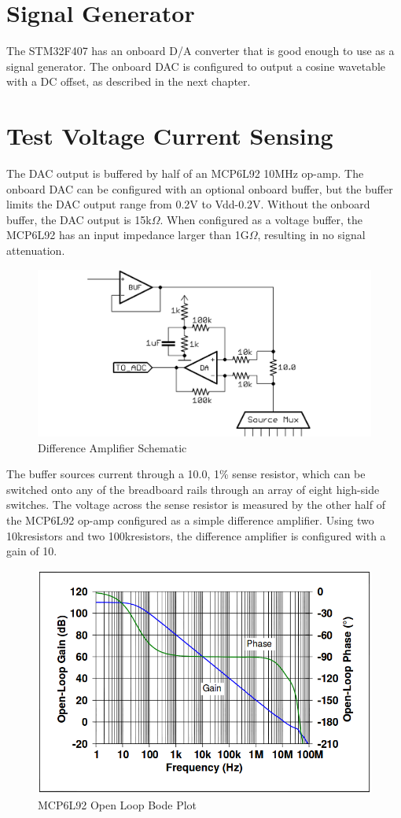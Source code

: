 \section{Signal Generator}

The STM32F407 has an onboard D/A converter that is good enough to use as a signal generator.
The onboard DAC is configured to output a cosine wavetable with a DC offset, as described in the next chapter.

\section{Test Voltage Current Sensing}

The DAC output is buffered by half of an MCP6L92 10MHz op-amp.
The onboard DAC can be configured with an optional onboard buffer, but the buffer limits the DAC output range from 0.2V to Vdd-0.2V.
Without the onboard buffer, the DAC output is 15k$\Omega$.
When configured as a voltage buffer, the MCP6L92 has an input impedance larger than 1G$\Omega$, resulting in no signal attenuation.

\begin{figure}[h!]
  \begin{center}
      \includegraphics[width=.7\textwidth]{../DA.png}
      \caption{Difference Amplifier Schematic}
  \end{center}
\end{figure}

The buffer sources current through a 10.0\ohm, 1\% sense resistor, which can be switched onto any of the breadboard rails through an array of eight high-side switches.
The voltage across the sense resistor is measured by the other half of the MCP6L92 op-amp configured as a simple difference amplifier.
Using two 10k\ohm resistors and two 100k\ohm resistors, the difference amplifier is configured with a gain of 10.  

\begin{figure}[h!]
  \begin{center}
      \includegraphics[width=.6\textwidth]{../opamp-bode.png}
      \caption{MCP6L92 Open Loop Bode Plot}
  \end{center}
\end{figure}

